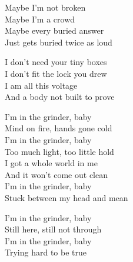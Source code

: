 \begin{lyrics}
Maybe I'm not broken\\
Maybe I'm a crowd\\
Maybe every buried answer\\
Just gets buried twice as loud

I don't need your tiny boxes\\
I don't fit the lock you drew\\
I am all this voltage\\
And a body not built to prove

I'm in the grinder, baby\\
Mind on fire, hands gone cold\\
I'm in the grinder, baby\\
Too much light, too little hold\\
I got a whole world in me\\
And it won't come out clean\\
I'm in the grinder, baby\\
Stuck between my head and mean

I'm in the grinder, baby\\
Still here, still not through\\
I'm in the grinder, baby\\
Trying hard to be true
\end{lyrics}

